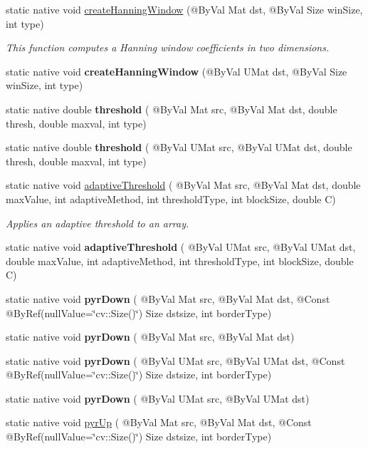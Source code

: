 \begin{DoxyCompactItemize}
\item 
static native void \hyperlink{group__imgproc__motion_ga219e0d1d1f1b5935a730317fc2f4d0d9}{create\+Hanning\+Window} (@By\+Val Mat dst, @By\+Val Size win\+Size, int type)
\begin{DoxyCompactList}\small\item\em This function computes a Hanning window coefficients in two dimensions. \end{DoxyCompactList}\item 
static native void {\bfseries create\+Hanning\+Window} (@By\+Val U\+Mat dst, @By\+Val Size win\+Size, int type)
\item 
static native double {\bfseries threshold} ( @By\+Val Mat src, @By\+Val Mat dst, double thresh, double maxval, int type)
\item 
static native double {\bfseries threshold} ( @By\+Val U\+Mat src, @By\+Val U\+Mat dst, double thresh, double maxval, int type)
\item 
static native void \hyperlink{group__imgproc__misc_ga7901ddcd72f108577c88250a35b9ccbd}{adaptive\+Threshold} ( @By\+Val Mat src, @By\+Val Mat dst, double max\+Value, int adaptive\+Method, int threshold\+Type, int block\+Size, double C)
\begin{DoxyCompactList}\small\item\em Applies an adaptive threshold to an array. \end{DoxyCompactList}\item 
static native void {\bfseries adaptive\+Threshold} ( @By\+Val U\+Mat src, @By\+Val U\+Mat dst, double max\+Value, int adaptive\+Method, int threshold\+Type, int block\+Size, double C)
\item 
static native void {\bfseries pyr\+Down} ( @By\+Val Mat src, @By\+Val Mat dst, @Const @By\+Ref(null\+Value=\char`\"{}cv\+::\+Size()\char`\"{}) Size dstsize, int border\+Type)
\item 
static native void {\bfseries pyr\+Down} ( @By\+Val Mat src, @By\+Val Mat dst)
\item 
static native void {\bfseries pyr\+Down} ( @By\+Val U\+Mat src, @By\+Val U\+Mat dst, @Const @By\+Ref(null\+Value=\char`\"{}cv\+::\+Size()\char`\"{}) Size dstsize, int border\+Type)
\item 
static native void {\bfseries pyr\+Down} ( @By\+Val U\+Mat src, @By\+Val U\+Mat dst)
\item 
static native void \hyperlink{group__imgproc__filter_ga3fc37612b218d8cee2f4b099a8d0a2aa}{pyr\+Up} ( @By\+Val Mat src, @By\+Val Mat dst, @Const @By\+Ref(null\+Value=\char`\"{}cv\+::\+Size()\char`\"{}) Size dstsize, int border\+Type)

\end{DoxyCompactItemize}
